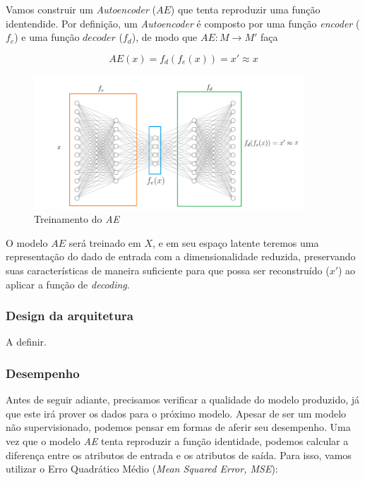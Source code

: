 Vamos construir um \textit{Autoencoder} ($AE$) que tenta reproduzir uma função identendide. Por definição, um \textit{Autoencoder} é composto por uma função \textit{encoder} ($f_e$) e uma função $decoder$ ($f_d$), de modo que $AE: M \rightarrow M'$ faça

\begin{equation}
    AE(x) = f_d(f_e(x)) = x' \approx x
\end{equation}

\begin{figure}[!h]
\centering
\includegraphics[width=0.9\textwidth]{imagens/p-autoencoder.png}
\caption{\label{fig:treinamentoae}Treinamento do \textit{AE}}
\end{figure}

O modelo $AE$ será treinado em $X$, e em seu espaço latente teremos uma representação do dado de entrada com a dimensionalidade reduzida, preservando suas características de maneira suficiente para que possa ser reconstruído ($x'$) ao aplicar a função de \textit{decoding}.

\subsubsection{Design da arquitetura}

A definir.

\subsubsection{Desempenho}

Antes de seguir adiante, precisamos verificar a qualidade do modelo produzido, já que este irá prover os dados para o próximo modelo. Apesar de ser um modelo não supervisionado, podemos pensar em formas de aferir seu desempenho. Uma vez que o modelo \textit{AE} tenta reproduzir a função identidade, podemos calcular a diferença entre os atributos de entrada e os atributos de saída. Para isso, vamos utilizar o Erro Quadrático Médio (\textit{Mean Squared Error, MSE}):


